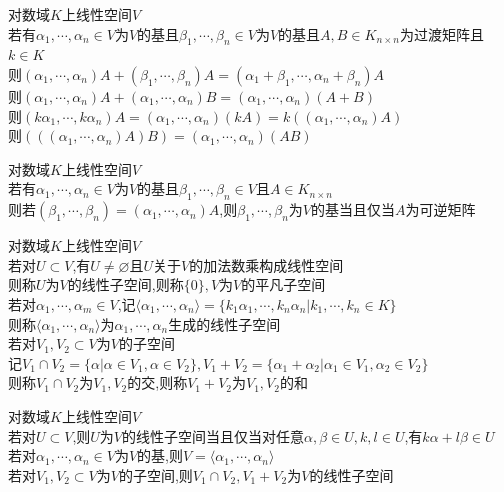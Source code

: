 \begin{dingli}
对数域$K$上线性空间$V$\\
若有$\alpha_1,\cdots,\alpha_n\in V$为$V$的基且$\beta_1,\cdots,\beta_n\in V$为$V$的基且$A,B\in K_{n\times n}$为过渡矩阵且$k\in K$\\
则$(\alpha_1,\cdots,\alpha_n)A+(\beta_1,\cdots,\beta_n)A=(\alpha_1+\beta_1,\cdots,\alpha_n+\beta_n)A$\\
则$(\alpha_1,\cdots,\alpha_n)A+(\alpha_1,\cdots,\alpha_n)B=(\alpha_1,\cdots,\alpha_n)(A+B)$\\
则$(k\alpha_1,\cdots,k\alpha_n)A=(\alpha_1,\cdots,\alpha_n)(kA)=k((\alpha_1,\cdots,\alpha_n)A)$\\
则$(((\alpha_1,\cdots,\alpha_n)A)B)=(\alpha_1,\cdots,\alpha_n)(AB)$
\end{dingli}

\begin{dingli}
对数域$K$上线性空间$V$\\
若有$\alpha_1,\cdots,\alpha_n\in V$为$V$的基且$\beta_1,\cdots,\beta_n\in V$且$A\in K_{n\times n}$\\
则若$(\beta_1,\cdots,\beta_n)=(\alpha_1,\cdots,\alpha_n)A$,则$\beta_1,\cdots,\beta_n$为$V$的基当且仅当$A$为可逆矩阵
\end{dingli}

\begin{dingyi}
对数域$K$上线性空间$V$\\
若对$U\subset V$,有$U\neq\varnothing$且$U$关于$V$的加法数乘构成线性空间\\
则称$U$为$V$的线性子空间,则称$\{0\},V$为$V$的平凡子空间\\
若对$\alpha_1,\cdots,\alpha_m\in V$,记$\langle\alpha_1,\cdots,\alpha_n\rangle=\{k_1\alpha_1,\cdots,k_n\alpha_n|k_1,\cdots,k_n\in K\}$\\
则称$\langle\alpha_1,\cdots,\alpha_n\rangle$为$\alpha_1,\cdots,\alpha_n$生成的线性子空间\\
若对$V_1,V_2\subset V$为$V$的子空间\\
记$V_1\cap V_2=\{\alpha|\alpha\in V_1,\alpha\in V_2\},V_1+V_2=\{\alpha_1+\alpha_2|\alpha_1\in V_1,\alpha_2\in V_2\}$\\
则称$V_1\cap V_2$为$V_1,V_2$的交,则称$V_1+V_2$为$V_1,V_2$的和
\end{dingyi}

\begin{dingli}
对数域$K$上线性空间$V$\\
若对$U\subset V$,则$U$为$V$的线性子空间当且仅当对任意$\alpha,\beta\in U,k,l\in U$,有$k\alpha+l\beta\in U$\\
若对$\alpha_1,\cdots,\alpha_n\in V$为$V$的基,则$V=\langle\alpha_1,\cdots,\alpha_n\rangle$\\
若对$V_1,V_2\subset V$为$V$的子空间,则$V_1\cap V_2,V_1+V_2$为$V$的线性子空间
\end{dingli}

